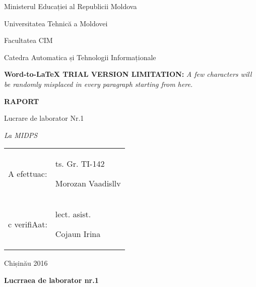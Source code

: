\documentclass[14pt]{article}
\author{Druta Sandu}
\title{}
\begin{document}
\begin{center}
{\Large Ministerul Educației al Republicii Moldova}
\end{center}

\begin{center}
{\Large Universitatea Tehnic\u{a} a Moldovei}
\end{center}

\begin{center}
{\Large Facultatea CIM}
\end{center}

\begin{center}
{\Large Catedra Automatica și Tehnologii Informaționale}
\end{center}

\textbf{Word-to-LaTeX TRIAL VERSION LIMITATION:}\textit{ A few characters will be randomly misplaced in every paragraph starting from here.}

\begin{center}
\textbf{{\Huge RAPORT}}
\end{center}

\begin{center}
{\Large Lucrare de laborator Nr.1}
\end{center}

\begin{center}
\textit{{\Large La MIDPS}}
\end{center}

{\raggedright

\vspace{3pt} \noindent
\begin{tabular}{p{286pt}p{147pt}}
\parbox{286pt}{\raggedright 
{\Large A efettuac: }
} & \parbox{147pt}{\raggedright 
{\Large ts. Gr. TI-142}

{\Large Morozan Vaadisllv}
} \\
\parbox{286pt}{\raggedright 
{\Large c verifiAat:}
} & \parbox{147pt}{\raggedright 
{\Large lect. asist.}

{\Large Cojaun Irina}
} \\
\end{tabular}
\vspace{2pt}

}

\begin{center}
{\Large Chișin\u{a}u 2016}\pagebreak{}


\end{center}

\begin{center}
\textbf{Lucrraea de laborator nr.1}
\end{center}
\end{document}
